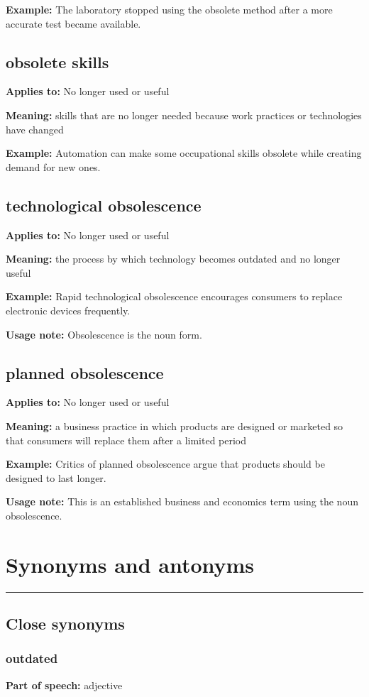 \documentclass[11pt]{article}
\newcommand{\sectionrule}{\par\vspace{-0.5em}\noindent\textcolor{Accent}{\rule{\linewidth}{0.6pt}}\par}
\begin{document}
\textbf{Example:} The laboratory stopped using the obsolete method after a more accurate test became available.

\subsection{obsolete skills}
\textbf{Applies to:} No longer used or useful

\textbf{Meaning:} skills that are no longer needed because work practices or technologies have changed

\textbf{Example:} Automation can make some occupational skills obsolete while creating demand for new ones.

\subsection{technological obsolescence}
\textbf{Applies to:} No longer used or useful

\textbf{Meaning:} the process by which technology becomes outdated and no longer useful

\textbf{Example:} Rapid technological obsolescence encourages consumers to replace electronic devices frequently.

\textbf{Usage note:} Obsolescence is the noun form.

\subsection{planned obsolescence}
\textbf{Applies to:} No longer used or useful

\textbf{Meaning:} a business practice in which products are designed or marketed so that consumers will replace them after a limited period

\textbf{Example:} Critics of planned obsolescence argue that products should be designed to last longer.

\textbf{Usage note:} This is an established business and economics term using the noun obsolescence.

\section{Synonyms and antonyms}
\sectionrule
\subsection{Close synonyms}
\subsubsection{outdated}
\textbf{Part of speech:} adjective
\end{document}

